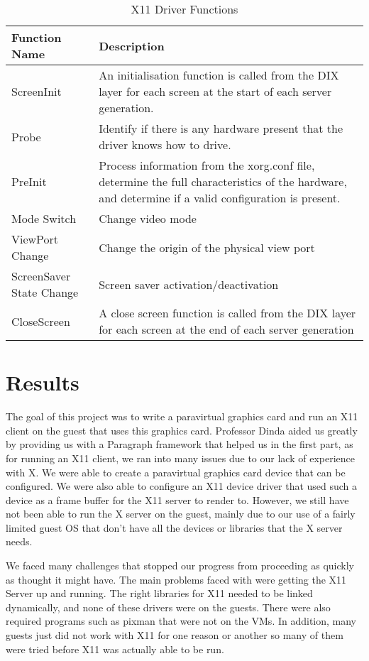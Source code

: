 \documentclass{acm_proc_article-sp}
\begin{document}
\begin{table}
 \centering
  \caption{X11 Driver Functions}
  \begin{tabular}{|l|p{4cm}|} \hline
  \textbf{Function Name}&\textbf{Description}\\ \hline
  ScreenInit & An initialisation function is called from the DIX layer for each screen at the start of each server generation.\\ \hline
  Probe & Identify if there is any hardware present that the driver knows how to drive.\\ \hline
  PreInit & Process information from the xorg.conf file, determine the full characteristics of the hardware, and determine if a valid configuration is present. \\ \hline
  Mode Switch & Change video mode \\ \hline
  ViewPort Change & Change the origin of the physical view port \\ \hline
  ScreenSaver State Change & Screen saver activation/deactivation \\ \hline
  CloseScreen & A close screen function is called from the DIX layer for each screen at the end of each server generation \\ \hline
\end{tabular}
\end{table}


\section{Results}
The goal of this project was to write a paravirtual graphics card and run an X11
client on the guest that uses this graphics card. Professor Dinda aided us
greatly by providing us with a Paragraph framework that helped us in the first
part, as for running an X11 client, we ran into many issues due to our lack of
experience with X. We were able to create a paravirtual graphics card device
that can be configured. 
We were also able to configure an X11 device driver that used such a device as a
frame buffer for the X11 server to render to. However, we still have not been able to run
the X server on the guest, mainly due to our use of a fairly limited guest OS
that don't have all the devices or libraries that the X server needs.

We faced many challenges that stopped our progress from proceeding as quickly as thought it might have. The main problems faced with were getting the X11 Server up and running. The right libraries for X11 needed to be linked dynamically, and none of these drivers were on the guests. There were also required programs such as pixman that were not on the VMs. In addition, many guests just did not work with X11 for one reason or another so many of them were tried before X11 was actually able to be run. 
\end{document}
